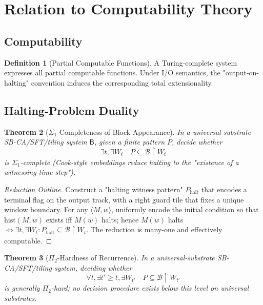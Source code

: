 \documentclass[12pt]{article}
\theoremstyle{plain}
\newtheorem{theorem}{Theorem}[section]
\theoremstyle{definition}
\newtheorem{definition}[theorem]{Definition}
\begin{document}
\section{Relation to Computability Theory}

\subsection{Computability}

\begin{definition}[Partial Computable Functions]
A Turing-complete system expresses all partial computable functions. Under I/O semantics, the "output-on-halting" convention induces the corresponding total extensionality.
\end{definition}

\subsection{Halting-Problem Duality}

\begin{theorem}[$\Sigma_1$-Completeness of Block Appearance]
In a universal-substrate SB-CA/SFT/tiling system $\mathsf{B}$, given a finite pattern $P$, decide whether
\[
\exists t,\exists W_t\quad P\subseteq \mathcal{B}\upharpoonright W_t
\]
is $\Sigma_1$-complete (Cook-style embeddings reduce halting to the "existence of a witnessing time step").
\end{theorem}

\begin{proof}[Reduction Outline]
Construct a "halting witness pattern" $P_{\mathrm{halt}}$ that encodes a terminal flag on the output track, with a right guard tile that fixes a unique window boundary. For any $\langle M,w\rangle$, uniformly encode the initial condition so that $\mathrm{hist}(M,w)$ exists iff $M(w)$ halts; hence $M(w)$ halts $\Leftrightarrow \exists t,\exists W_t: P_{\mathrm{halt}}\subseteq \mathcal{B}\upharpoonright W_t$. The reduction is many-one and effectively computable.
\end{proof}

\begin{theorem}[$\Pi_2$-Hardness of Recurrence]
In a universal-substrate SB-CA/SFT/tiling system, deciding whether
\[
\forall t,\exists t'\ge t,\exists W_{t'}\quad P\subseteq \mathcal{B}\upharpoonright W_{t'}
\]
is generally $\Pi_2$-hard; no decision procedure exists below this level on universal substrates.
\end{theorem}
\end{document}
